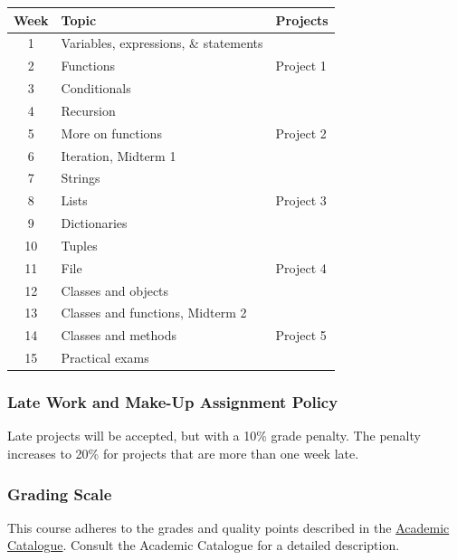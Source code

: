 \documentclass[10pt]{article}
\begin{document}
\begin{center}
\begin{tabular}{|c|l|l|}
\hline
Week  & Topic & Projects \\ \hline
1  & Variables, expressions, \& statements & \\
2  & Functions                             & Project 1 \\
3  & Conditionals                          & \\
4  & Recursion                             & \\
5  & More on functions                     & Project 2 \\
6  & Iteration, Midterm 1                  & \\
7  & Strings                               & \\
8  & Lists                                 & Project 3 \\
9  & Dictionaries                          & \\
10 & Tuples                                & \\
11 & File                                  & Project 4 \\
12 & Classes and objects                   & \\
13 & Classes and functions, Midterm 2      & \\
14 & Classes and methods                   & Project 5 \\
15 & Practical exams                       & \\ \hline
\end{tabular}
\end{center}

\subsubsection*{Late Work and Make-Up Assignment Policy}

Late projects will be accepted, but with a 10\% grade penalty.  The penalty increases to 20\% for projects that are more than one week late. 

\subsubsection*{Grading Scale} 

This course adheres to the grades and quality points described in the \href{https://www.hsc.edu/academic-catalogues}{Academic Catalogue}. Consult the Academic Catalogue for a detailed description. 
\end{document}
